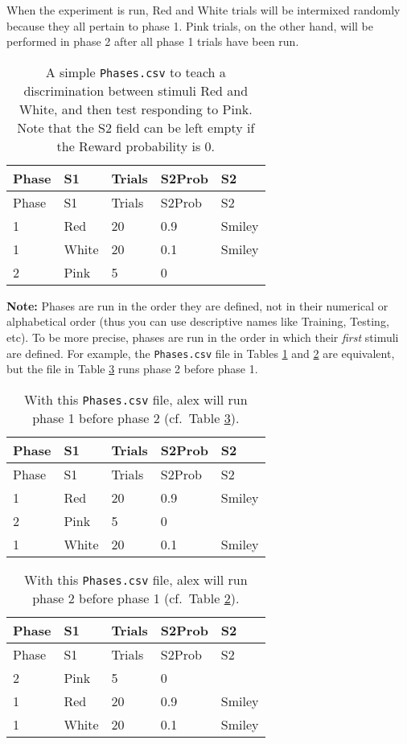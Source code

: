 \documentclass[11pt,]{article}
\begin{document}
When the experiment is run, Red and White trials will be intermixed
randomly because they all pertain to phase 1. Pink trials, on the other
hand, will be performed in phase 2 after all phase 1 trials have been
run.

\begin{longtable}[c]{@{}lllll@{}}
\caption{A simple \texttt{Phases.csv} to teach a discrimination between
stimuli Red and White, and then test responding to Pink. Note that the
S2 field can be left empty if the Reward probability is 0.
\label{phases}}\tabularnewline
\toprule
Phase & S1 & Trials & S2Prob & S2\tabularnewline
\midrule
\endfirsthead
\toprule
Phase & S1 & Trials & S2Prob & S2\tabularnewline
\midrule
\endhead
1 & Red & 20 & 0.9 & Smiley\tabularnewline
1 & White & 20 & 0.1 & Smiley\tabularnewline
2 & Pink & 5 & 0 &\tabularnewline
\bottomrule
\end{longtable}

\pagebreak

\textbf{Note:} Phases are run in the order they are defined, not in
their numerical or alphabetical order (thus you can use descriptive
names like Training, Testing, etc). To be more precise, phases are run
in the order in which their \emph{first} stimuli are defined. For
example, the \texttt{Phases.csv} file in Tables \ref{phases} and
\ref{phases-order1} are equivalent, but the file in Table
\ref{phases-order2} runs phase 2 before phase 1.

\begin{longtable}[c]{@{}lllll@{}}
\caption{With this \texttt{Phases.csv} file, alex will run phase 1
before phase 2 (cf.~Table \ref{phases-order2}).
\label{phases-order1}}\tabularnewline
\toprule
Phase & S1 & Trials & S2Prob & S2\tabularnewline
\midrule
\endfirsthead
\toprule
Phase & S1 & Trials & S2Prob & S2\tabularnewline
\midrule
\endhead
1 & Red & 20 & 0.9 & Smiley\tabularnewline
2 & Pink & 5 & 0 &\tabularnewline
1 & White & 20 & 0.1 & Smiley\tabularnewline
\bottomrule
\end{longtable}

\begin{longtable}[c]{@{}lllll@{}}
\caption{With this \texttt{Phases.csv} file, alex will run phase 2
before phase 1 (cf.~Table \ref{phases-order1}).
\label{phases-order2}}\tabularnewline
\toprule
Phase & S1 & Trials & S2Prob & S2\tabularnewline
\midrule
\endfirsthead
\toprule
Phase & S1 & Trials & S2Prob & S2\tabularnewline
\midrule
\endhead
2 & Pink & 5 & 0 &\tabularnewline
1 & Red & 20 & 0.9 & Smiley\tabularnewline
1 & White & 20 & 0.1 & Smiley\tabularnewline
\bottomrule
\end{longtable}
\end{document}
